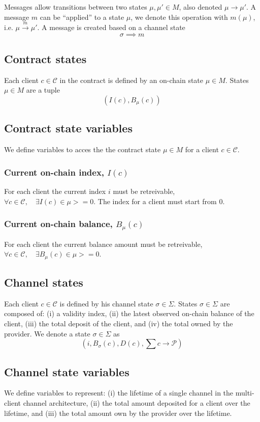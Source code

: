 \documentclass{llncs}
\begin{document}
Messages allow transitions between two states $\mu, \mu' \in M$, also denoted $\mu \rightarrow \mu '$. A message $m$ can be ``applied'' to a state $\mu$, we denote this operation with $m(\mu)$, i.e. $\mu \xrightarrow{m} \mu'$. A message is created based on a channel state
$$\sigma \implies m$$

\subsection{Contract states} Each client $c \in \mathcal{C}$ in the contract is defined by an on-chain state $\mu \in M$. States $\mu \in M$ are a tuple
$$(I(c), B_\mu(c))$$

\subsection{Contract state variables} We define variables to acces the the contract state $\mu \in M$ for a client $c \in \mathcal{C}$.

\subsubsection{Current on-chain index, $I(c)$} For each client the current index $i$ must be retreivable, $\forall c \in \mathcal{C}, \quad \exists I(c) \in \mu >= 0$. The index for a client must start from $0$.

\subsubsection{Current on-chain balance, $B_\mu(c)$} For each client the current balance amount must be retreivable, $\forall c \in \mathcal{C}, \quad \exists B_\mu(c) \in \mu >= 0$.

\subsection{Channel states} Each client $c \in \mathcal{C}$ is defined by his channel state $\sigma \in \Sigma$. States $\sigma \in \Sigma$ are composed of: (i) a validity index, (ii) the latest observed on-chain balance
of the client, (iii) the total deposit of the client, and (iv) the total owned by the provider. We denote a state $\sigma \in \Sigma$ as
$$(i, B_\sigma(c), D(c), \textstyle \sum c \rightarrow \mathcal{P})$$

\subsection{Channel state variables} We define variables to represent: (i) the lifetime of a single channel in the multi-client channel architecture, (ii) the total amount deposited for a client over the lifetime, and (iii) the total amount own by the provider over the lifetime.
\end{document}
